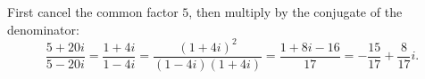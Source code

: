 First cancel the common factor $5$, then multiply by the conjugate of the denominator:
\[\dfrac{5+20i}{5-20i}=\dfrac{1+4i}{1-4i}=\dfrac{(1+4i)^2}{(1-4i)(1+4i)}=\dfrac{1+8i-16}{17}=\boxed{-\dfrac{15}{17}+\dfrac{8}{17}i}.\]
